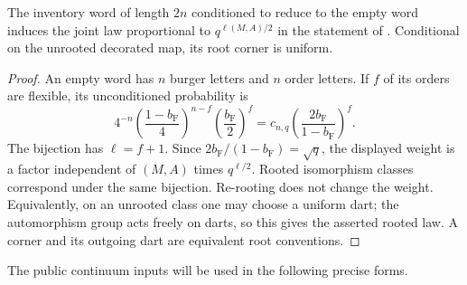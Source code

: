 \begin{lemma}\label{bg:finite-law}
The inventory word of length \(2n\) conditioned to reduce to the empty word induces the joint law proportional to \(q^{\ell(M,A)/2}\) in the statement of . Conditional on the unrooted decorated map, its root corner is uniform.
\end{lemma}
\begin{proof}
An empty word has \(n\) burger letters and \(n\) order letters. If \(f\) of its orders are flexible, its unconditioned probability is
\[
 4^{-n}\left(\frac{1-b_{\mathrm F}}4\right)^{n-f}
       \left(\frac{b_{\mathrm F}}2\right)^f
 =c_{n,q}\left(\frac{2b_{\mathrm F}}{1-b_{\mathrm F}}\right)^f.
\]
The bijection has \(\ell=f+1\). Since \(2b_{\mathrm F}/(1-b_{\mathrm F})=\sqrt q\), the displayed weight is a factor independent of \((M,A)\) times \(q^{\ell/2}\). Rooted isomorphism classes correspond under the same bijection. Re-rooting does not change the weight. Equivalently, on an unrooted class one may choose a uniform dart; the automorphism group acts freely on darts, so this gives the asserted rooted law. A corner and its outgoing dart are equivalent root conventions.
\end{proof}

The public continuum inputs will be used in the following precise forms.

